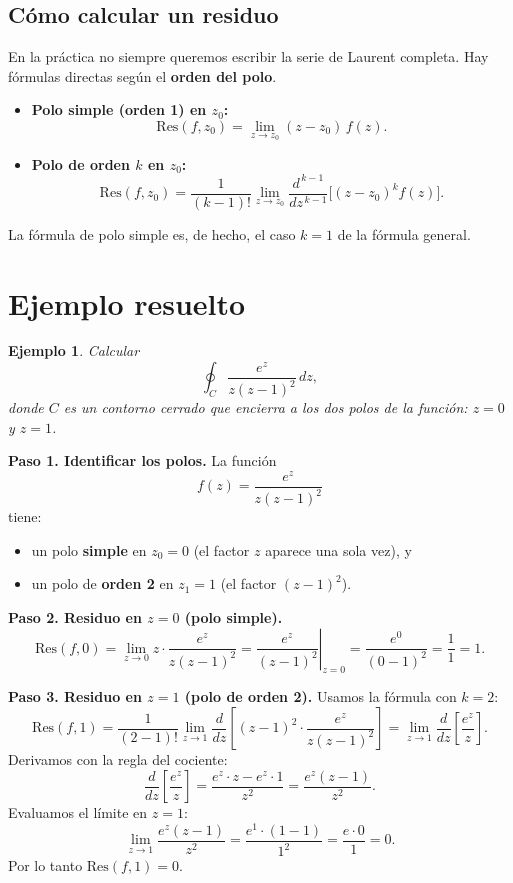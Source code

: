 \documentclass[12pt]{article}
\newtheorem*{ejemplo}{Ejemplo}
\begin{document}
\subsection{Cómo calcular un residuo}

En la práctica no siempre queremos escribir la serie de Laurent completa. Hay fórmulas directas según el \textbf{orden del polo}.

\begin{itemize}[leftmargin=1.2cm]
    \item \textbf{Polo simple (orden 1) en $z_0$:}
    \[
    \mathrm{Res}(f, z_0) = \lim_{z \to z_0} (z - z_0)\, f(z).
    \]

    \item \textbf{Polo de orden $k$ en $z_0$:}
    \[
    \mathrm{Res}(f, z_0) = \frac{1}{(k-1)!} \lim_{z \to z_0} \frac{d^{\,k-1}}{dz^{\,k-1}} \Big[ (z - z_0)^k f(z) \Big].
    \]
\end{itemize}

La fórmula de polo simple es, de hecho, el caso $k=1$ de la fórmula general.

\section{Ejemplo resuelto}

\begin{ejemplo}
Calcular
\[
\oint_{C} \frac{e^z}{z(z-1)^2}\,dz,
\]
donde $C$ es un contorno cerrado que encierra a los dos polos de la función: $z=0$ y $z=1$.
\end{ejemplo}

\noindent \textbf{Paso 1. Identificar los polos.}
La función
\[
f(z) = \frac{e^z}{z(z-1)^2}
\]
tiene:
\begin{itemize}
    \item un polo \textbf{simple} en $z_0 = 0$ (el factor $z$ aparece una sola vez), y
    \item un polo de \textbf{orden 2} en $z_1 = 1$ (el factor $(z-1)^2$).
\end{itemize}

\noindent \textbf{Paso 2. Residuo en $z=0$ (polo simple).}
\[
\mathrm{Res}(f,0) = \lim_{z \to 0} z \cdot \frac{e^z}{z(z-1)^2} = \left.\frac{e^z}{(z-1)^2}\right|_{z=0} = \frac{e^0}{(0-1)^2} = \frac{1}{1} = 1.
\]

\noindent \textbf{Paso 3. Residuo en $z=1$ (polo de orden 2).}
Usamos la fórmula con $k=2$:
\[
\mathrm{Res}(f,1) = \frac{1}{(2-1)!}\lim_{z \to 1} \frac{d}{dz}\left[ (z-1)^2 \cdot \frac{e^z}{z(z-1)^2} \right] = \lim_{z\to 1} \frac{d}{dz}\left[\frac{e^z}{z}\right].
\]
Derivamos con la regla del cociente:
\[
\frac{d}{dz}\left[\frac{e^z}{z}\right] = \frac{e^z \cdot z - e^z \cdot 1}{z^2} = \frac{e^z (z-1)}{z^2}.
\]
Evaluamos el límite en $z=1$:
\[
\lim_{z\to 1} \frac{e^z(z-1)}{z^2} = \frac{e^1 \cdot (1-1)}{1^2} = \frac{e \cdot 0}{1} = 0.
\]
Por lo tanto $\mathrm{Res}(f,1) = 0$.
\end{document}
